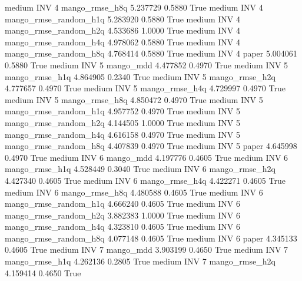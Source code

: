     medium      INV                 4        mango_rmse_h8q   5.237729      0.5880    True
    medium      INV                 4 mango_rmse_random_h1q   5.283920      0.5880    True
    medium      INV                 4 mango_rmse_random_h2q   4.533686      1.0000    True
    medium      INV                 4 mango_rmse_random_h4q   4.978062      0.5880    True
    medium      INV                 4 mango_rmse_random_h8q   4.768414      0.5880    True
    medium      INV                 4                 paper   5.004061      0.5880    True
    medium      INV                 5             mango_mdd   4.477852      0.4970    True
    medium      INV                 5        mango_rmse_h1q   4.864905      0.2340    True
    medium      INV                 5        mango_rmse_h2q   4.777657      0.4970    True
    medium      INV                 5        mango_rmse_h4q   4.729997      0.4970    True
    medium      INV                 5        mango_rmse_h8q   4.850472      0.4970    True
    medium      INV                 5 mango_rmse_random_h1q   4.957752      0.4970    True
    medium      INV                 5 mango_rmse_random_h2q   4.144505      1.0000    True
    medium      INV                 5 mango_rmse_random_h4q   4.616158      0.4970    True
    medium      INV                 5 mango_rmse_random_h8q   4.407839      0.4970    True
    medium      INV                 5                 paper   4.645998      0.4970    True
    medium      INV                 6             mango_mdd   4.197776      0.4605    True
    medium      INV                 6        mango_rmse_h1q   4.528449      0.3040    True
    medium      INV                 6        mango_rmse_h2q   4.427340      0.4605    True
    medium      INV                 6        mango_rmse_h4q   4.422271      0.4605    True
    medium      INV                 6        mango_rmse_h8q   4.480588      0.4605    True
    medium      INV                 6 mango_rmse_random_h1q   4.666240      0.4605    True
    medium      INV                 6 mango_rmse_random_h2q   3.882383      1.0000    True
    medium      INV                 6 mango_rmse_random_h4q   4.323810      0.4605    True
    medium      INV                 6 mango_rmse_random_h8q   4.077148      0.4605    True
    medium      INV                 6                 paper   4.345133      0.4605    True
    medium      INV                 7             mango_mdd   3.903199      0.4650    True
    medium      INV                 7        mango_rmse_h1q   4.262136      0.2805    True
    medium      INV                 7        mango_rmse_h2q   4.159414      0.4650    True
